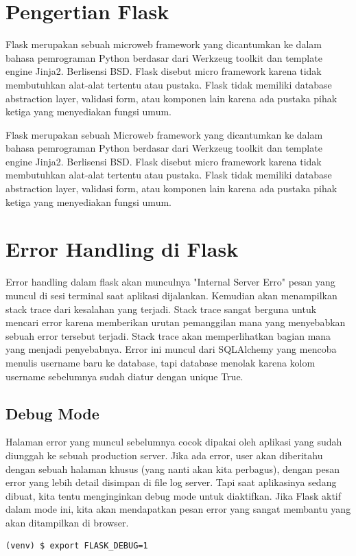 
\section{Pengertian Flask}
Flask merupakan sebuah microweb framework yang dicantumkan ke dalam bahasa pemrograman Python berdasar dari Werkzeug toolkit dan template engine Jinja2. Berlisensi BSD. Flask disebut micro framework karena tidak membutuhkan alat-alat tertentu atau pustaka. Flask tidak memiliki database abstraction layer, validasi form, atau komponen lain karena ada pustaka pihak ketiga yang menyediakan fungsi umum.

Flask merupakan sebuah Microweb framework yang dicantumkan ke dalam bahasa pemrograman Python berdasar dari Werkzeug toolkit dan template engine Jinja2. Berlisensi BSD. Flask disebut micro framework karena tidak membutuhkan alat-alat tertentu atau pustaka. Flask tidak memiliki database abstraction layer, validasi form, atau komponen lain karena ada pustaka pihak ketiga yang menyediakan fungsi umum.

\section{Error Handling di Flask}
Error handling dalam flask akan munculnya "Internal Server Erro" pesan yang muncul di sesi terminal saat aplikasi dijalankan. Kemudian akan menampilkan  stack trace dari kesalahan yang terjadi. Stack trace sangat berguna untuk mencari error karena memberikan urutan pemanggilan mana yang menyebabkan sebuah error tersebut terjadi. Stack trace akan memperlihatkan bagian mana yang menjadi penyebabnya. Error ini muncul dari SQLAlchemy yang mencoba menulis username baru ke database, tapi database menolak karena kolom username sebelumnya sudah diatur dengan unique True.

\subsection{Debug Mode}
Halaman error yang muncul sebelumnya cocok dipakai oleh aplikasi yang sudah diunggah ke sebuah production server. Jika ada error, user akan diberitahu dengan sebuah halaman khusus (yang nanti akan kita perbagus), dengan pesan error yang lebih detail disimpan di file log server.
Tapi saat aplikasinya sedang dibuat, kita tentu menginginkan debug mode untuk diaktifkan. Jika Flask aktif dalam mode ini, kita akan mendapatkan pesan error yang sangat membantu yang akan ditampilkan di browser.

\begin{verbatim}
(venv) $ export FLASK_DEBUG=1
\end{verbatim}

